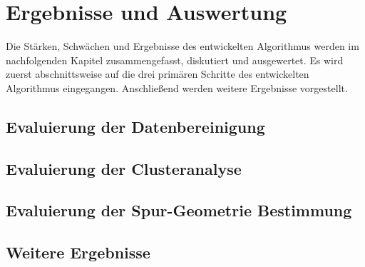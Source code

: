 
\chapter{Ergebnisse und Auswertung}
\label{cha:results}


Die Stärken, Schwächen und Ergebnisse des entwickelten Algorithmus werden im nachfolgenden Kapitel
zusammengefasst, diskutiert und ausgewertet. Es wird zuerst abschnittsweise auf die drei primären Schritte
des entwickelten Algorithmus eingegangen. Anschließend werden weitere Ergebnisse vorgestellt.

\section{Evaluierung der Datenbereinigung}

\section{Evaluierung der Clusteranalyse}

\section{Evaluierung der Spur-Geometrie Bestimmung}

\section{Weitere Ergebnisse}
